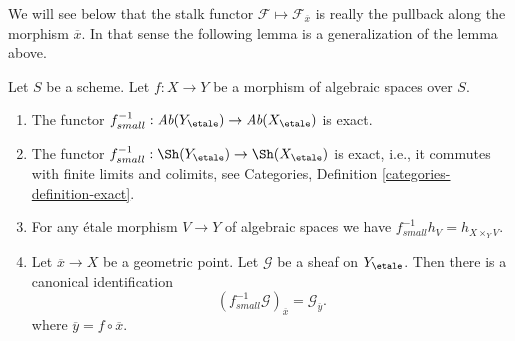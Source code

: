 \noindent
We will see below that the stalk functor
$\mathcal{F} \mapsto \mathcal{F}_{\overline{x}}$
is really the pullback along the morphism $\overline{x}$. In that sense
the following lemma is a generalization of the lemma above.

\begin{lemma}
\label{lemma-stalk-pullback}
Let $S$ be a scheme.
Let $f : X \to Y$ be a morphism of algebraic spaces over $S$.
\begin{enumerate}
\item The functor
$f_{small}^{-1} :
\textit{Ab}(Y_\etale)
\to
\textit{Ab}(X_\etale)$
is exact.
\item The functor
$f_{small}^{-1} :
\Sh(Y_\etale)
\to
\Sh(X_\etale)$
is exact, i.e., it commutes with finite limits and colimits, see
Categories, Definition \ref{categories-definition-exact}.
\item For any \'etale morphism $V \to Y$ of algebraic spaces
we have $f_{small}^{-1}h_V = h_{X \times_Y V}$.
\item Let $\overline{x} \to X$ be a geometric point.
Let $\mathcal{G}$ be a sheaf on $Y_\etale$.
Then there is a canonical identification
$$
(f_{small}^{-1}\mathcal{G})_{\overline{x}} = \mathcal{G}_{\overline{y}}.
$$
where $\overline{y} = f \circ \overline{x}$.
\end{enumerate}
\end{lemma}

